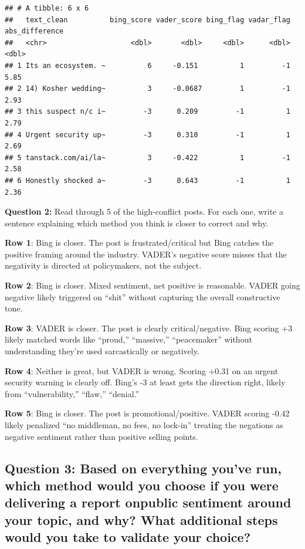 \documentclass[
]{article}
\begin{document}
\begin{verbatim}
## # A tibble: 6 x 6
##   text_clean          bing_score vader_score bing_flag vadar_flag abs_difference
##   <chr>                    <dbl>       <dbl>     <dbl>      <dbl>          <dbl>
## 1 Its an ecosystem. ~          6     -0.151          1         -1           5.85
## 2 14) Kosher wedding~          3     -0.0687         1         -1           2.93
## 3 this suspect n/c i~         -3      0.209         -1          1           2.79
## 4 Urgent security up~         -3      0.310         -1          1           2.69
## 5 tanstack.com/ai/la~          3     -0.422          1         -1           2.58
## 6 Honestly shocked a~         -3      0.643         -1          1           2.36
\end{verbatim}

\textbf{Question 2:} Read through 5 of the high-conflict posts. For each
one, write a sentence explaining which method you think is closer to
correct and why.

\textbf{Row 1}: Bing is closer. The post is frustrated/critical but Bing
catches the positive framing around the industry. VADER's negative score
misses that the negativity is directed at policymakers, not the subject.

\textbf{Row 2}: Bing is closer. Mixed sentiment, net positive is
reasonable. VADER going negative likely triggered on ``shit'' without
capturing the overall constructive tone.

\textbf{Row 3}: VADER is closer. The post is clearly critical/negative.
Bing scoring +3 likely matched words like ``proud,'' ``massive,''
``peacemaker'' without understanding they're used sarcastically or
negatively.

\textbf{Row 4}: Neither is great, but VADER is wrong. Scoring +0.31 on
an urgent security warning is clearly off. Bing's -3 at least gets the
direction right, likely from ``vulnerability,'' ``flaw,'' ``denial.''

\textbf{Row 5}: Bing is closer. The post is promotional/positive. VADER
scoring -0.42 likely penalized ``no middleman, no fees, no lock-in''
treating the negations as negative sentiment rather than positive
selling points.

\subsection{\texorpdfstring{\textbf{Question 3:} Based on everything
you've run, which method would you choose if you were delivering a
report onpublic sentiment around your topic, and why? What additional
steps would you take to validate your
choice?}{Question 3: Based on everything you've run, which method would you choose if you were delivering a report onpublic sentiment around your topic, and why? What additional steps would you take to validate your choice?}}\label{question-3-based-on-everything-youve-run-which-method-would-you-choose-if-you-were-delivering-a-report-onpublic-sentiment-around-your-topic-and-why-what-additional-steps-would-you-take-to-validate-your-choice}
\end{document}
